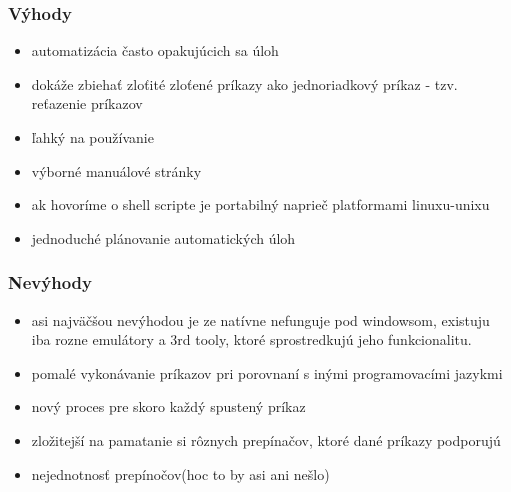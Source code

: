 \subsubsection{Výhody}
\begin{itemize}
\item automatizácia často opakujúcich sa úloh
\item dokáže zbiehať zloťité zloťené príkazy ako jednoriadkový príkaz  - tzv. reťazenie príkazov
\item ľahký na používanie
\item výborné manuálové stránky
\item ak hovoríme o shell scripte je portabilný naprieč platformami linuxu-unixu
\item jednoduché plánovanie automatických úloh
\newline
\end{itemize}
\subsubsection{Nevýhody}
\begin{itemize}
\item asi najväčšou nevýhodou je ze natívne nefunguje pod windowsom, existuju iba rozne emulátory a 3rd tooly, ktoré sprostredkujú jeho funkcionalitu.
\item pomalé vykonávanie príkazov pri porovnaní s inými programovacími jazykmi
\item nový proces pre skoro každý spustený príkaz
\item zložitejší na pamatanie si rôznych prepínačov, ktoré dané príkazy podporujú
\item nejednotnosť prepínočov(hoc to by asi ani nešlo)
\end{itemize}
